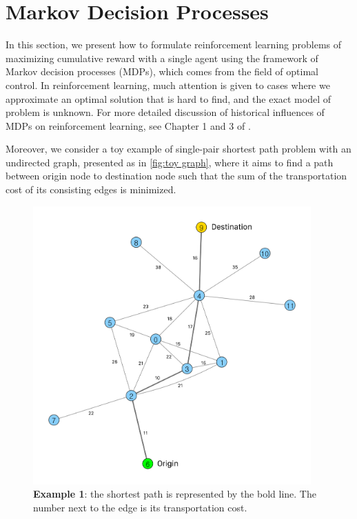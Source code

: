 \section{Markov Decision Processes}
\label{sec: Markov Decision Process}
In this section, we present how to formulate reinforcement learning problems of maximizing cumulative reward with a single agent using the framework of Markov decision processes (MDPs), which comes from the field of optimal control. In reinforcement learning, much attention is given to cases where we approximate an optimal solution that is hard to find, and the exact model of problem is unknown. For more detailed discussion of historical influences of MDPs on reinforcement learning, see Chapter 1 and 3 of \citeauthor{sutton2018reinforcement} \cite{sutton2018reinforcement}.

Moreover, we consider a toy example of single-pair shortest path problem with an undirected graph, presented as in \autoref{fig:toy graph}, where it aims to find a path between origin node to destination node such that the sum of the transportation cost of its consisting edges is minimized.

\begin{figure}[hbt!]
    \centering
    \includegraphics[width=0.95\textwidth]{figures/Reinforcement/figure1.png}
    \caption{\textbf{Example 1}: the shortest path is represented by the bold line. The number next to the edge is its transportation cost.}
    \label{fig:toy graph}
\end{figure}
\clearpage

